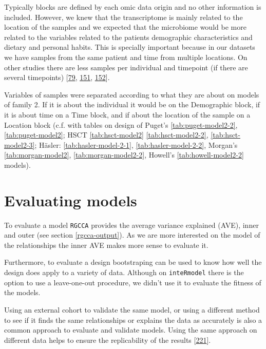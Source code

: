 \documentclass[
  a4paper,
]{book}
\begin{document}
Typically blocks are defined by each omic data origin and no other information is included.
However, we knew that the transcriptome is mainly related to the location of the samples and we expected that the microbiome would be more related to the variables related to the patients demographic characteristics and dietary and personal habits.
This is specially important because in our datasets we have samples from the same patient and time from multiple locations.
On other studies there are less samples per individual and timepoint (if there are several timepoints) {[}\protect\hyperlink{ref-hasler_uncoupling_2016}{79}, \protect\hyperlink{ref-morgan2015}{151}, \protect\hyperlink{ref-howell2018}{152}{]}.

Variables of samples were separated according to what they are about on models of family 2.
If it is about the individual it would be on the Demographic block, if it is about time on a Time block, and if about the location of the sample on a Location block (c.f. with tables on design of Puget's \ref{tab:puget-model2-2}, \ref{tab:puget-model2}; HSCT \ref{tab:hsct-model2} \ref{tab:hsct-model2-2}, \ref{tab:hsct-model2-3}; Häsler: \ref{tab:hasler-model-2-1}, \ref{tab:hasler-model-2-2}, Morgan's \ref{tab:morgan-model2}, \ref{tab:morgan-model2-2}, Howell's \ref{tab:howell-model2-2} models).

\hypertarget{evaluating-models}{%
\section{Evaluating models}\label{evaluating-models}}

To evaluate a model \texttt{RGCCA} provides the average variance explained (AVE), inner and outer (see section \ref{rgcca-output}).
As we are more interested on the model of the relationships the inner AVE makes more sense to evaluate it.

Furthermore, to evaluate a design bootstraping can be used to know how well the design does apply to a variety of data.
Although on \texttt{inteRmodel} there is the option to use a leave-one-out procedure, we didn't use it to evaluate the fitness of the models.

Using an external cohort to validate the same model, or using a different method to see if it finds the same relationships or explains the data as accurately is also a common approach to evaluate and validate models.
Using the same approach on different data helps to ensure the replicability of the results {[}\protect\hyperlink{ref-community2021}{221}{]}.
\end{document}
